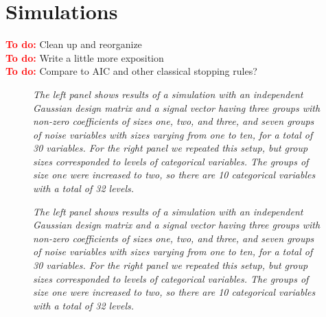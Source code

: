 \documentclass{imsart}
\newcommand{\todo}{\textcolor{red}{\textbf{To do: }}}
\begin{document}
\section{Simulations}
\label{sec:simulations}

\todo Clean up and reorganize \\
\todo Write a little more exposition \\
\todo Compare to AIC and other classical stopping rules? \\


\begin{figure}[h]
\begin{center}
\hspace{-15pt}
\caption{\small \it The left panel shows results of a simulation with
  an independent Gaussian design matrix and a signal vector having
  three groups with non-zero coefficients of sizes one, two, and
  three, and seven groups of noise variables with sizes varying from
  one to ten, for a total of 30 variables. For the right panel we
  repeated this setup, but group sizes corresponded to levels of
  categorical variables. The groups of size one were increased to two,
so there are 10 categorical variables with a total of 32 levels.}
\end{center}
\end{figure}






\begin{figure}[h]
\begin{center}
\hspace{-15pt}
\caption{\small \it The left panel shows results of a simulation with
  an independent Gaussian design matrix and a signal vector having
  three groups with non-zero coefficients of sizes one, two, and
  three, and seven groups of noise variables with sizes varying from
  one to ten, for a total of 30 variables. For the right panel we
  repeated this setup, but group sizes corresponded to levels of
  categorical variables. The groups of size one were increased to two,
so there are 10 categorical variables with a total of 32 levels.}
\end{center}
\end{figure}
\end{document}
